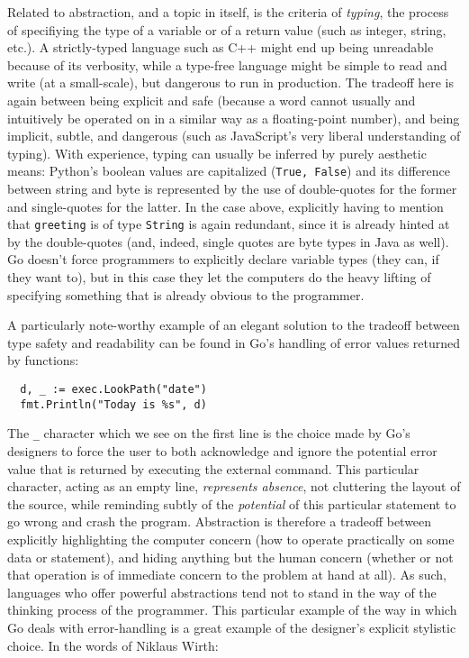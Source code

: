 Related to abstraction, and a topic in itself, is the criteria of \emph{typing}, the process of specifiying the type of a variable or of a return value (such as integer, string, etc.). A strictly-typed language such as C++ might end up being unreadable because of its verbosity, while a type-free language might be simple to read and write (at a small-scale), but dangerous to run in production. The tradeoff here is again between being explicit and safe (because a word cannot usually and intuitively be operated on in a similar way as a floating-point number), and being implicit, subtle, and dangerous (such as JavaScript's very liberal understanding of typing). With experience, typing can usually be inferred by purely aesthetic means: Python's boolean values are capitalized (\lstinline{True, False}) and its difference between string and byte is represented by the use of double-quotes for the former and single-quotes for the latter. In the case above, explicitly having to mention that \lstinline{greeting} is of type \lstinline{String} is again redundant, since it is already hinted at by the double-quotes (and, indeed, single quotes are byte types in Java as well). Go doesn't force programmers to explicitly declare variable types (they can, if they want to), but in this case they let the computers do the heavy lifting of specifying something that is already obvious to the programmer.

A particularly note-worthy example of an elegant solution to the tradeoff between type safety and readability can be found in Go's handling of error values returned by functions:

\begin{lstlisting}
  d, _ := exec.LookPath("date")
  fmt.Println("Today is %s", d)
\end{lstlisting}

The \lstinline{_} character which we see on the first line is the choice made by Go's designers to force the user to both acknowledge and ignore the potential error value that is returned by executing the external command. This particular character, acting as an empty line, \emph{represents absence}, not cluttering the layout of the source, while reminding subtly of the \emph{potential} of this particular statement to go wrong and crash the program. Abstraction is therefore a tradeoff between explicitly highlighting the computer concern (how to operate practically on some data or statement), and hiding anything but the human concern (whether or not that operation is of immediate concern to the problem at hand at all). As such, languages who offer powerful abstractions tend not to stand in the way of the thinking process of the programmer. This particular example of the way in which Go deals with error-handling is a great example of the designer's explicit stylistic choice. In the words of Niklaus Wirth:

